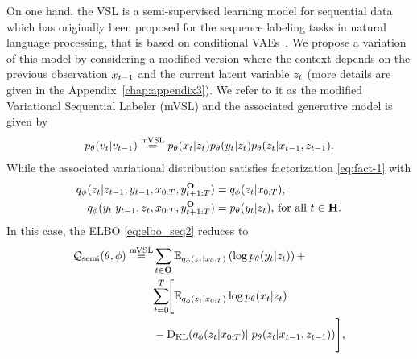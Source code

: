 On one hand, the VSL is a semi-supervised learning model
for sequential data which has originally been proposed for the 
sequence labeling tasks in natural language processing, 
that is based on conditional VAEs~\citep{pagnoni2018conditional}.
We propose a variation of this model by considering a modified version
where the context depends on the previous observation $x_{t-1}$ 
and the current latent variable $z_t$ 
(more details are given in the Appendix~\ref{chap:appendix3}).
We refer to it as the modified Variational Sequential Labeler (mVSL)
and the associated generative model is given by
\begin{align*}
p_{\theta}(v_t|v_{t-1}) \overset{\rm mVSL}{=}  p_{\theta}(x_t|z_t) 
p_{\theta}(y_t|z_t) p_{\theta}(z_t|x_{t-1}, z_{t-1})  
\text{.}
\end{align*}
While the associated variational distribution
satisfies factorization \eqref{eq:fact-1}
with
\begin{align}
    q_\phi(z_t|z_{t-1},y_{t-1},x_{0:T},y_{t+1:T}^{\mathbf{O}})
    &=q_\phi(z_t|x_{0:T}) \text{,} \\
    q_\phi(y_t|y_{t-1},z_t,x_{0:T},y_{t+1:T}^{\mathbf{O}})
    &=p_{\theta}(y_t|z_t) \text{, for all } t \in \mathbf{H} \text{.}
\end{align}   
In this case, the ELBO \eqref{eq:elbo_seq2} reduces to
\begin{align*}
    \mathcal{Q}_{\mathrm{semi}}(\theta,\phi) \overset{\rm mVSL}{=}& 
    \sum_{t \in \mathbf{O}} {\mathbb{E}}_{q_\phi(z_{t}| x_{0:T})} \left(
     \log p_{\theta}(y_{t}|z_{t}) \right) + \nonumber \\
    & \! \sum_{t=0}^T\!\!
    \Bigg[ {\mathbb{E}}_{q_\phi(z_{t}| x_{0:T})} \log p_{\theta}(x_t|z_t) \nonumber \\
    & -    \mathrm{D}_{\mathrm{KL}}(q_\phi(z_t|x_{0:T})|| p_{\theta}(z_t|x_{t-1}, z_{t-1} ))  \Bigg] 
    \text{,}
\end{align*}
